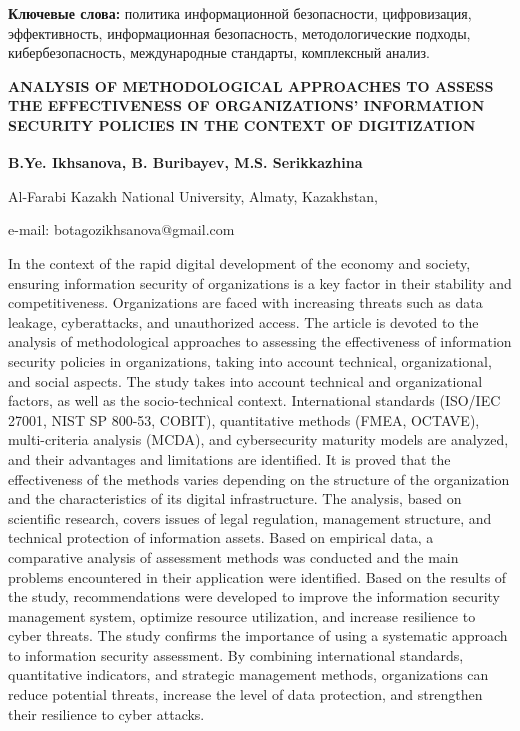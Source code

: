 {\bfseries Ключевые слова:} политика информационной безопасности,
цифровизация, эффективность, информационная безопасность,
методологические подходы, кибербезопасность, международные стандарты,
комплексный анализ.

\begin{articleheader}
{\bfseries ANALYSIS OF METHODOLOGICAL APPROACHES TO ASSESS THE
EFFECTIVENESS OF ORGANIZATIONS'{} INFORMATION SECURITY
POLICIES IN THE CONTEXT OF DIGITIZATION}

{\bfseries
B.Ye. Ikhsanova\textsuperscript{\envelope },
B. Buribayev,
M.S. Serikkazhina
}
\end{articleheader}

\begin{affiliation}
Al-Farabi Kazakh National University, Almaty, Kazakhstan,

e-mail: botagozikhsanova@gmail.com
\end{affiliation}

In the context of the rapid digital development of the economy and
society, ensuring information security of organizations is a key factor
in their stability and competitiveness. Organizations are faced with
increasing threats such as data leakage, cyberattacks, and unauthorized
access. The article is devoted to the analysis of methodological
approaches to assessing the effectiveness of information security
policies in organizations, taking into account technical,
organizational, and social aspects. The study takes into account
technical and organizational factors, as well as the socio-technical
context. International standards (ISO/IEC 27001, NIST SP 800-53, COBIT),
quantitative methods (FMEA, OCTAVE), multi-criteria analysis (MCDA), and
cybersecurity maturity models are analyzed, and their advantages and
limitations are identified. It is proved that the effectiveness of the
methods varies depending on the structure of the organization and the
characteristics of its digital infrastructure. The analysis, based on
scientific research, covers issues of legal regulation, management
structure, and technical protection of information assets. Based on
empirical data, a comparative analysis of assessment methods was
conducted and the main problems encountered in their application were
identified. Based on the results of the study, recommendations were
developed to improve the information security management system,
optimize resource utilization, and increase resilience to cyber threats.
The study confirms the importance of using a systematic approach to
information security assessment. By combining international standards,
quantitative indicators, and strategic management meth\-ods, organizations
can reduce potential threats, increase the level of data protection, and
strengthen their resilience to cyber attacks.

